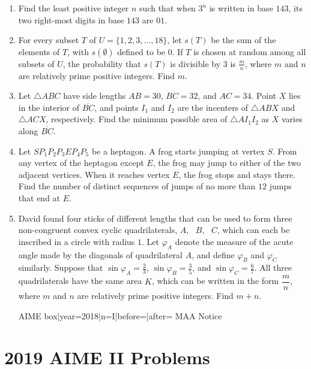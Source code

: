 \documentclass{article}
\begin{document}
\begin{enumerate}[label=\arabic*., itemsep=0.5em]
\par \vspace{0.5em}\item Find the least positive integer \(n\) such that when \(3^n\) is written in base \(143\), its two right-most digits in base \(143\) are \(01\).\par \vspace{0.5em}\item For every subset \(T\) of \(U = \{ 1,2,3,\ldots,18 \}\), let \(s(T)\) be the sum of the elements of \(T\), with \(s(\emptyset)\) defined to be \(0\). If \(T\) is chosen at random among all subsets of \(U\), the probability that \(s(T)\) is divisible by \(3\) is \(\frac{m}{n}\), where \(m\) and \(n\) are relatively prime positive integers. Find \(m\).\par \vspace{0.5em}\item Let \(\triangle ABC\) have side lengths \(AB=30\), \(BC=32\), and \(AC=34\). Point \(X\) lies in the interior of \(\overline{BC}\), and points \(I_1\) and \(I_2\) are the incenters of \(\triangle ABX\) and \(\triangle ACX\), respectively. Find the minimum possible area of \(\triangle AI_1I_2\) as \(X\) varies along \(\overline{BC}\).\par \vspace{0.5em}\item Let \(SP_1P_2P_3EP_4P_5\) be a heptagon. A frog starts jumping at vertex \(S\). From any vertex of the heptagon except \(E\), the frog may jump to either of the two adjacent vertices. When it reaches vertex \(E\), the frog stops and stays there. Find the number of distinct sequences of jumps of no more than \(12\) jumps that end at \(E\).\par \vspace{0.5em}\item David found four sticks of different lengths that can be used to form three non-congruent convex cyclic quadrilaterals, \(A,\text{ }B,\text{ }C\), which can each be inscribed in a circle with radius \(1\). Let \(\varphi_A\) denote the measure of the acute angle made by the diagonals of quadrilateral \(A\), and define \(\varphi_B\) and \(\varphi_C\) similarly. Suppose that \(\sin\varphi_A=\frac{2}{3}\), \(\sin\varphi_B=\frac{3}{5}\), and \(\sin\varphi_C=\frac{6}{7}\). All three quadrilaterals have the same area \(K\), which can be written in the form \(\dfrac{m}{n}\), where \(m\) and \(n\) are relatively prime positive integers. Find \(m+n\).



{{AIME box|year=2018|n=I|before=|after=}}
{{MAA Notice}}\par \vspace{0.5em}\end{enumerate}\newpage\section*{2019 AIME II Problems}
\end{document}
